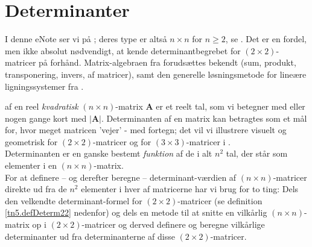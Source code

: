
\setcounter{chapter}{4} %


\chapter{Determinanter} \label{tn5}


\begin{basis}
I denne eNote ser vi på ; deres type er altså $n \times n$ for $n \geq 2$, se . Det er en fordel, men ikke absolut nødvendigt, at kende determinantbegrebet for $(2 \times 2)$-matricer på forhånd. Matrix-algebraen fra  forudsættes bekendt (sum, produkt, transponering, invers, af matricer), samt den generelle løsningsmetode for lineære ligningssystemer fra .
\end{basis}


 af en reel {\textit{kvadratisk}} $(n \times n)$-matrix $\mathbf{A}$ er et reelt tal, som vi betegner med  eller nogen gange kort med $|\mathbf{A}|$. Determinanten af en matrix kan betragtes som et mål for, hvor meget matricen 'vejer' - med fortegn; det vil vi illustrere visuelt og geometrisk for $(2 \times 2)$-matricer og for $(3 \times 3)$-matricer i . \\

Determinanten er en ganske bestemt {\textit{funktion}} af de i alt $n^{2}$ tal, der står som elementer i en $(n \times n)$-matrix.\\

For at definere -- og derefter beregne -- determinant-værdien af $(n \times n)$-matricer direkte ud fra de $n^{2}$ elementer i hver af matricerne har vi brug for to ting: Dels den velkendte determinant-formel for $(2 \times 2)$-matricer (se definition \ref{tn5.defDeterm22} nedenfor) og dels en  metode til at snitte en vilkårlig $(n \times n)$-matrix op i $(2 \times 2)$-matricer og derved definere og beregne vilkårlige determinanter ud fra determinanterne af disse $(2 \times 2)$-matricer.

